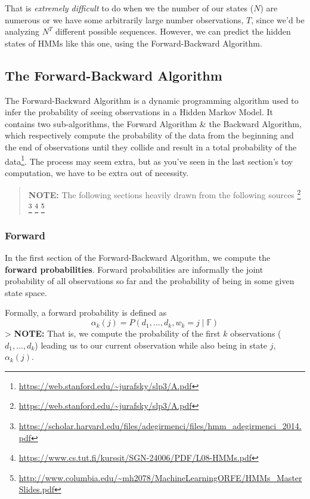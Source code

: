 \documentclass[
]{book}
\begin{document}
That is \emph{extremely difficult} to do when we the number of our states (\(N\)) are numerous or we have some arbitrarily large number observations, \(T\), since we'd be analyzing \(N^T\) different possible sequences. However, we can predict the hidden states of HMMs like this one, using the Forward-Backward Algorithm.

\hypertarget{the-forward-backward-algorithm}{%
\subsection*{The Forward-Backward Algorithm}\label{the-forward-backward-algorithm}}

The Forward-Backward Algorithm is a dynamic programming algorithm used to infer the probability of seeing observations in a Hidden Markov Model. It contains two sub-algorithms, the Forward Algorithm \& the Backward Algorithm, which respectively compute the probability of the data from the beginning and the end of observations until they collide and result in a total probability of the data\footnote{\url{https://web.stanford.edu/~jurafsky/slp3/A.pdf}}. The process may seem extra, but as you've seen in the last section's toy computation, we have to be extra out of necessity.

\begin{quote}
\textbf{NOTE:} The following sections heavily drawn from the following sources \footnote{\url{https://web.stanford.edu/~jurafsky/slp3/A.pdf}} \footnote{\url{https://scholar.harvard.edu/files/adegirmenci/files/hmm_adegirmenci_2014.pdf}} \footnote{\url{https://www.cs.tut.fi/kurssit/SGN-24006/PDF/L08-HMMs.pdf}} \footnote{\url{http://www.columbia.edu/~mh2078/MachineLearningORFE/HMMs_MasterSlides.pdf}}
\end{quote}

\hypertarget{forward}{%
\subsubsection*{Forward}\label{forward}}

In the first section of the Forward-Backward Algorithm, we compute the \textbf{forward probabilities}. Forward probabilities are informally the joint probability of all observations so far and the probability of being in some given state space.

Formally, a forward probability is defined as
\[\alpha_k(j) = P(d_1, \dots , d_k,w_k = j \mid \mathbb{F}) \]
\textgreater{} \textbf{NOTE:} That is, we compute the probability of the first \(k\) observations (\(d_1,\dots, d_k\)) leading us to our current observation while also being in state \(j\), \(\alpha_k(j)\).
\end{document}
